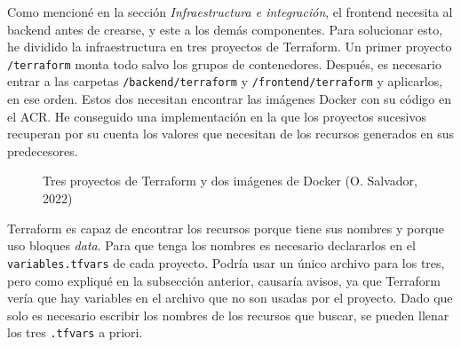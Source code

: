 \documentclass[11pt]{article}
\begin{document}
\begin{flushleft}
	 Como mencioné en la sección \textit{Infraestructura e integración}, el frontend necesita al backend antes de crearse, y este a los demás componentes. Para solucionar esto, he dividido la infraestructura en tres proyectos de Terraform. Un primer proyecto \texttt{/terraform} monta todo salvo los grupos de contenedores. Después, es necesario entrar a las carpetas \texttt{/backend/terraform} y \texttt{/frontend/terraform} y aplicarlos, en ese orden. Estos dos necesitan encontrar las imágenes Docker con su código en el ACR. He conseguido una implementación en la que los proyectos sucesivos recuperan por su cuenta los valores que necesitan de los recursos generados en sus predecesores.
	 \linebreak
	 
	\begin{figure}[htb]
		\centering
		\caption{Tres proyectos de Terraform y dos imágenes de Docker (O. Salvador, 2022)}
	\end{figure}
	
	\clearpage
	Terraform es capaz de encontrar los recursos porque tiene sus nombres y porque uso bloques \textit{data}. Para que tenga los nombres es necesario declararlos en el \texttt{variables.tfvars} de cada proyecto. Podría usar un único archivo para los tres, pero como expliqué en la subsección anterior, causaría avisos, ya que Terraform vería que hay variables en el archivo que no son usadas por el proyecto. Dado que solo es necesario escribir los nombres de los recursos que buscar, se pueden llenar los tres \texttt{.tfvars} a priori. 
	\linebreak
	

\end{flushleft}
\end{document}
